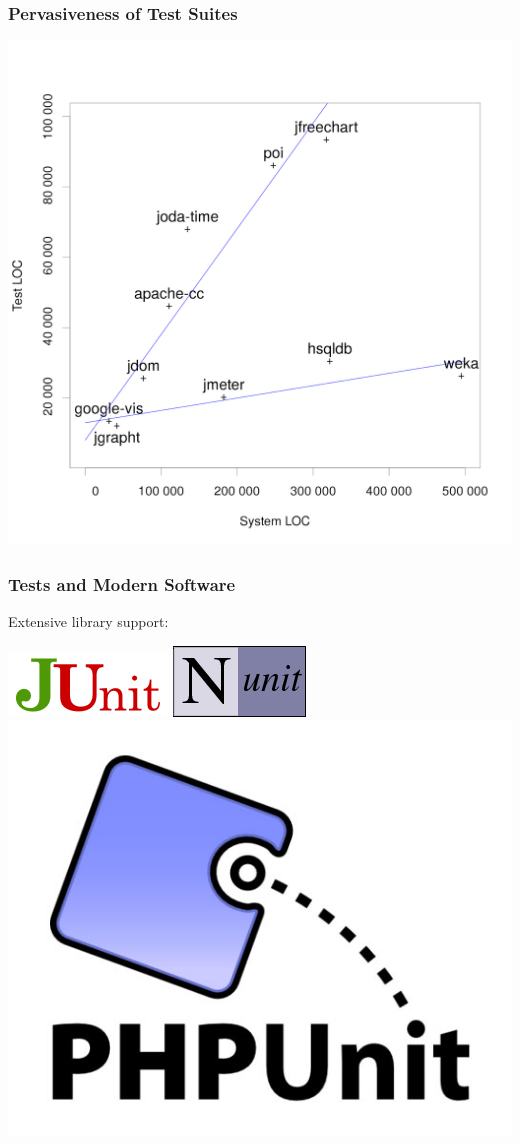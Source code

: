 \documentclass{beamer}
\begin{document}
\begin{frame}
  \frametitle{Pervasiveness of Test Suites}
\begin{center}
\includegraphics[width=\textwidth, height=.8\textheight, keepaspectratio=true]{images/test-vs-system.png}
\end{center}
\end{frame}

\begin{frame}
  \frametitle{Tests and Modern Software}
\Large  Extensive library support:

\begin{center}
\includegraphics[width=.2\textwidth] {images/junit-logo.png} \hspace*{3em}
\includegraphics[width=.2\textwidth] {images/Nunit.png}  \hspace*{3em}
\includegraphics[width=.2\textwidth] {images/PHPUnit-logo.jpg}
\end{center}

\end{frame}
\end{document}
